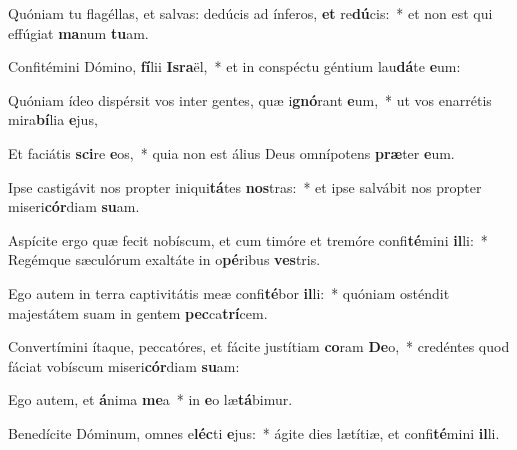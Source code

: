 \item Quóniam tu flagéllas, et salvas: dedúcis ad ínferos, \textbf{et} re\textbf{dú}cis:~* et non est qui effúgiat \textbf{ma}num \textbf{tu}am.
\item Confitémini Dómino, \textbf{fí}lii \textbf{Is}\textbf{ra}ël,~* et in conspéctu géntium lau\textbf{dá}te \textbf{e}um:
\item Quóniam ídeo dispérsit vos inter gentes, quæ i\textbf{gnó}rant \textbf{e}um,~* ut vos enarrétis mira\textbf{bí}lia \textbf{e}jus,
\item Et faciátis \textbf{sci}re \textbf{e}os,~* quia non est álius Deus omnípotens \textbf{præ}ter \textbf{e}um.
\item Ipse castigávit nos propter iniqui\textbf{tá}tes \textbf{nos}tras:~* et ipse salvábit nos propter miseri\textbf{cór}diam \textbf{su}am.
\item Aspícite ergo quæ fecit nobíscum, et cum timóre et tremóre confi\textbf{té}mini \textbf{il}li:~* Regémque sæculórum exaltáte in o\textbf{pé}ribus \textbf{ves}tris.
\item Ego autem in terra captivitátis meæ confi\textbf{té}bor \textbf{il}li:~* quóniam osténdit majestátem suam in gentem \textbf{pec}ca\textbf{trí}cem.
\item Convertímini ítaque, peccatóres, et fácite justítiam \textbf{co}ram \textbf{De}o,~* credéntes quod fáciat vobíscum miseri\textbf{cór}diam \textbf{su}am:
\item Ego autem, et \textbf{á}nima \textbf{me}a~* in \textbf{e}o læ\textbf{tá}bimur.
\item Benedícite Dóminum, omnes e\textbf{léc}ti \textbf{e}jus:~* ágite dies lætítiæ, et confi\textbf{té}mini \textbf{il}li.
